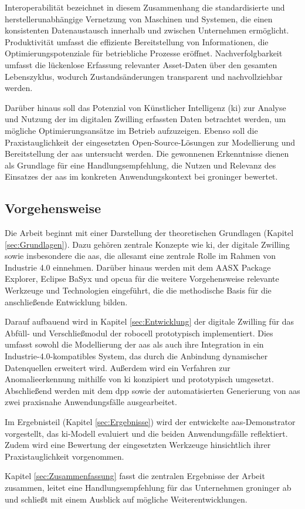 Interoperabilität bezeichnet in diesem Zusammenhang die standardisierte und hersteller\-unabhängige Vernetzung von Maschinen und Systemen, die einen konsistenten Datenaustausch innerhalb und zwischen Unternehmen ermöglicht. 
Produktivität umfasst die effiziente Bereitstellung von Informationen, die Optimierungspotenziale für betriebliche Prozesse eröffnet. 
Nachverfolgbarkeit umfasst die lückenlose Erfassung relevanter Asset-Daten über den gesamten Lebenszyklus, wodurch Zustandsänderungen transparent und nachvollziehbar werden.

Darüber hinaus soll das Potenzial von Künstlicher Intelligenz (\acs{ki}) zur Analyse und Nutzung der im digitalen Zwilling erfassten Daten betrachtet werden, um mögliche Optimierungsansätze im Betrieb aufzuzeigen. 
Ebenso soll die Praxistauglichkeit der eingesetzten Open-Source-Lösungen zur Modellierung und Bereitstellung der \acs{aas} untersucht werden.
Die gewonnenen Erkenntnisse dienen als Grundlage für eine Handlungsempfehlung, die Nutzen und Relevanz des Einsatzes der \acs{aas} im konkreten Anwendungskontext bei groninger bewertet.

\subsection{Vorgehensweise}

Die Arbeit beginnt mit einer Darstellung der theoretischen Grundlagen (Kapitel \ref{sec:Grundlagen}). 
Dazu gehören zentrale Konzepte wie \acs{ki}, der digitale Zwilling sowie insbesondere die \acs{aas}, die allesamt eine zentrale Rolle im Rahmen von Industrie 4.0 einnehmen. 
Darüber hinaus werden mit dem AASX Package Explorer, Eclipse BaSyx und \ac{opcua} für die weitere Vorgehensweise relevante Werkzeuge und Technologien eingeführt, die die methodische Basis für die anschließende Entwicklung bilden.

Darauf aufbauend wird in Kapitel \ref{sec:Entwicklung} der digitale Zwilling für das Abfüll- und Verschließmodul der robocell prototypisch implementiert. 
Dies umfasst sowohl die Modellierung der \acs{aas} als auch ihre Integration in ein Industrie-4.0-kompatibles System, das durch die Anbindung dynamischer Datenquellen erweitert wird. 
Außerdem wird ein Verfahren zur Anomalieerkennung mithilfe von \acs{ki} konzipiert und prototypisch umgesetzt. 
Abschließend werden mit dem \acs{dpp} sowie der automatisierten Generierung von \acs{aas} zwei praxisnahe Anwendungsfälle ausgearbeitet.

Im Ergebnisteil (Kapitel \ref{sec:Ergebnisse}) wird der entwickelte \acs{aas}-Demonstrator vorgestellt, das \acs{ki}-Modell evaluiert und die beiden Anwendungsfälle reflektiert. 
Zudem wird eine Bewertung der eingesetzten Werkzeuge hinsichtlich ihrer Praxistauglichkeit vorgenommen.

Kapitel \ref{sec:Zusammenfassung} fasst die zentralen Ergebnisse der Arbeit zusammen, leitet eine Handlungs\-empfehlung für das Unternehmen groninger ab und schließt mit einem Ausblick auf mögliche Weiterentwicklungen.
